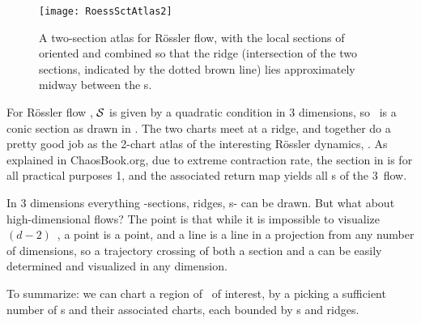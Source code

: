 \begin{figure}%
\begin{center}
  \texttt{[image: RoessSctAtlas2]}
\end{center}
  \caption{
  A two-section atlas for R\"ossler flow, with the local sections of
   oriented and combined so that
  the ridge (intersection of the two sections, indicated by the dotted brown
  line) lies  approximately midway between the \template s.
  } \label{fig:RoessBothEq}
\end{figure}


For R\"ossler flow , ${\cal S}$  is given by a
quadratic condition in 3 dimensions, so \poincBord\ is a conic section as
drawn in . The two
charts meet at a ridge, and together do a pretty good job as the 2-chart
atlas of the interesting R\"ossler dynamics, . As
explained in ChaosBook.org\cite{DasBuch}, due to extreme contraction rate, the section
in  is for all practical purposes 1\dmn, and the
associated return map yields all \po s of the 3\dmn\ flow.

In 3 dimensions everything -sections, ridges, \poincBord s-  can be
drawn. But what about high-dimensional flows? The point is that while it
is impossible to visualize  $(d\!-\!2)$\dmn\ {\poincBord}, a point is a
point, and a line is a line in a projection from any number of
dimensions, so a trajectory crossing of both a section and a {\poincBord}
can be easily determined and visualized in any dimension.


To summarize: we can chart a region of \statesp\ of interest, by a
picking a sufficient number of \template s and their associated charts,
each bounded by \poincBord s and ridges.

